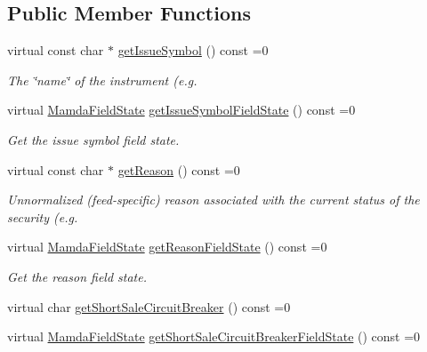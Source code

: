 \subsection*{Public Member Functions}
\begin{CompactItemize}
\item 
virtual const char $\ast$ \hyperlink{classWombat_1_1MamdaSecStatus_40ee188d2918841022327263a2b27fcd}{get\-Issue\-Symbol} () const =0
\begin{CompactList}\small\item\em The \char`\"{}name\char`\"{} of the instrument (e.g. \item\end{CompactList}\item 
virtual \hyperlink{namespaceWombat_93aac974f2ab713554fd12a1fa3b7d2a}{Mamda\-Field\-State} \hyperlink{classWombat_1_1MamdaSecStatus_9ec78fc150849e2bda7802f01d5b692c}{get\-Issue\-Symbol\-Field\-State} () const =0
\begin{CompactList}\small\item\em Get the issue symbol field state. \item\end{CompactList}\item 
virtual const char $\ast$ \hyperlink{classWombat_1_1MamdaSecStatus_6c6d3305ed2a2e06e8558647497a36d7}{get\-Reason} () const =0
\begin{CompactList}\small\item\em Unnormalized (feed-specific) reason associated with the current status of the security (e.g. \item\end{CompactList}\item 
virtual \hyperlink{namespaceWombat_93aac974f2ab713554fd12a1fa3b7d2a}{Mamda\-Field\-State} \hyperlink{classWombat_1_1MamdaSecStatus_63fcfbc175a0bab1fcf500007b831974}{get\-Reason\-Field\-State} () const =0
\begin{CompactList}\small\item\em Get the reason field state. \item\end{CompactList}\item 
virtual char \hyperlink{classWombat_1_1MamdaSecStatus_018c6d2c254aa4534d75b37a2d162061}{get\-Short\-Sale\-Circuit\-Breaker} () const =0
\item 
virtual \hyperlink{namespaceWombat_93aac974f2ab713554fd12a1fa3b7d2a}{Mamda\-Field\-State} \hyperlink{classWombat_1_1MamdaSecStatus_6bd9783d55cd92b9c4d7c7a2db736e27}{get\-Short\-Sale\-Circuit\-Breaker\-Field\-State} () const =0

\end{CompactItemize}
